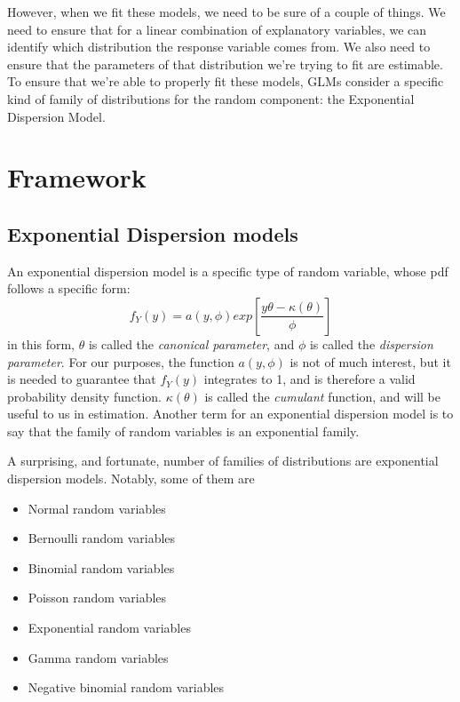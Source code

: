 \documentclass[
]{book}
\providecommand{\tightlist}{%
  \setlength{\itemsep}{0pt}\setlength{\parskip}{0pt}}
\begin{document}
However, when we fit these models, we need to be sure of a couple of things. We need to ensure that for a linear combination of explanatory variables, we can identify which distribution the response variable comes from. We also need to ensure that the parameters of that distribution we're trying to fit are estimable. To ensure that we're able to properly fit these models, GLMs consider a specific kind of family of distributions for the random component: the Exponential Dispersion Model.

\hypertarget{framework}{%
\section{Framework}\label{framework}}

\hypertarget{exponential-dispersion-models}{%
\subsection{Exponential Dispersion models}\label{exponential-dispersion-models}}

An exponential dispersion model is a specific type of random variable, whose pdf follows a specific form:
\[
f_{Y}(y) = a(y,\phi)exp\left[\frac{y\theta - \kappa(\theta)}{\phi}   \right]
\]
in this form, \(\theta\) is called the \emph{canonical parameter}, and \(\phi\) is called the \emph{dispersion parameter}. For our purposes, the function \(a(y,\phi)\) is not of much interest, but it is needed to guarantee that \(f_Y(y)\) integrates to 1, and is therefore a valid probability density function. \(\kappa(\theta)\) is called the \emph{cumulant} function, and will be useful to us in estimation. Another term for an exponential dispersion model is to say that the family of random variables is an exponential family.

A surprising, and fortunate, number of families of distributions are exponential dispersion models. Notably, some of them are

\begin{itemize}
\tightlist
\item
  Normal random variables
\item
  Bernoulli random variables
\item
  Binomial random variables
\item
  Poisson random variables
\item
  Exponential random variables
\item
  Gamma random variables
\item
  Negative binomial random variables
\end{itemize}
\end{document}
